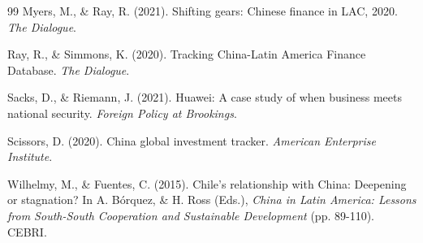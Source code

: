 \documentclass[12pt]{article}
\begin{document}
\begin{thebibliography}{99}
Myers, M., \& Ray, R. (2021). Shifting gears: Chinese finance in LAC, 2020. \textit{The Dialogue}.

Ray, R., \& Simmons, K. (2020). Tracking China-Latin America Finance Database. \textit{The Dialogue}.

Sacks, D., \& Riemann, J. (2021). Huawei: A case study of when business meets national security. \textit{Foreign Policy at Brookings}.

Scissors, D. (2020). China global investment tracker. \textit{American Enterprise Institute}.

Wilhelmy, M., \& Fuentes, C. (2015). Chile's relationship with China: Deepening or stagnation? In A. Bórquez, \& H. Ross (Eds.), \textit{China in Latin America: Lessons from South-South Cooperation and Sustainable Development} (pp. 89-110). CEBRI.

\end{thebibliography}
\end{document}
